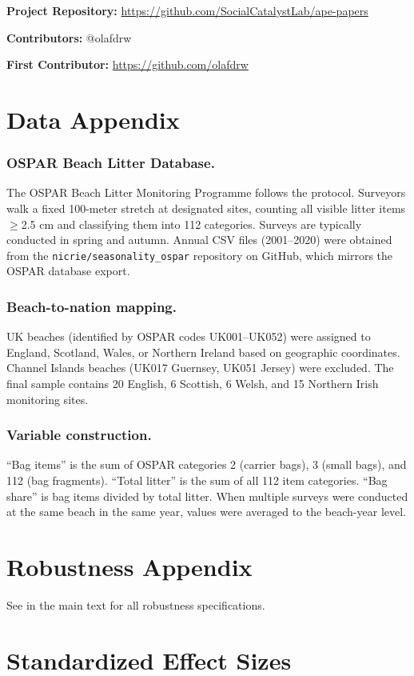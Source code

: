 \documentclass[12pt]{article}
\begin{document}
\noindent\textbf{Project Repository:} \url{https://github.com/SocialCatalystLab/ape-papers}

\noindent\textbf{Contributors:} @olafdrw

\noindent\textbf{First Contributor:} \url{https://github.com/olafdrw}

\label{apep_main_text_end}
\newpage


\newpage
\appendix

\section{Data Appendix}

\subsubsection*{OSPAR Beach Litter Database.} The OSPAR Beach Litter Monitoring Programme follows the \citet{ospar_commission_guideline_2010} protocol. Surveyors walk a fixed 100-meter stretch at designated sites, counting all visible litter items $\geq$2.5 cm and classifying them into 112 categories. Surveys are typically conducted in spring and autumn. Annual CSV files (2001--2020) were obtained from the \texttt{nicrie/seasonality\_ospar} repository on GitHub, which mirrors the OSPAR database export.

\subsubsection*{Beach-to-nation mapping.} UK beaches (identified by OSPAR codes UK001--UK052) were assigned to England, Scotland, Wales, or Northern Ireland based on geographic coordinates. Channel Islands beaches (UK017 Guernsey, UK051 Jersey) were excluded. The final sample contains 20 English, 6 Scottish, 6 Welsh, and 15 Northern Irish monitoring sites.

\subsubsection*{Variable construction.} ``Bag items'' is the sum of OSPAR categories 2 (carrier bags), 3 (small bags), and 112 (bag fragments). ``Total litter'' is the sum of all 112 item categories. ``Bag share'' is bag items divided by total litter. When multiple surveys were conducted at the same beach in the same year, values were averaged to the beach-year level.

\section{Robustness Appendix}

See  in the main text for all robustness specifications.

\section{Standardized Effect Sizes}
\label{sec:sde}


\end{document}

